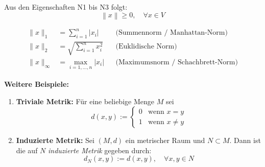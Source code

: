 \begin{bemerkungbox}
    Aus den Eigenschaften N1 bis N3 folgt:
    $$
        \left\|x\right\| \geq 0, \quad \forall x \in V
    $$
\end{bemerkungbox}

\begin{beispielbox}
    \begin{align*}
        \|x\|_1 &= \sum_{i=1}^n |x_i| && \text{(Summennorm / Manhattan-Norm)} \\
        \|x\|_2 &= \sqrt{\sum_{i=1}^n x_i^2} && \text{(Euklidische Norm)} \\
        \|x\|_\infty &= \max_{i=1,\dots,n} |x_i| && \text{(Maximumsnorm / Schachbrett-Norm)}
    \end{align*}



    \textbf{Weitere Beispiele:}
    \begin{enumerate}
        \item \textbf{Triviale Metrik:} Für eine beliebige Menge $M$ sei
        $$
        d(x, y) := \begin{cases}
            0 & \text{wenn } x = y \\
            1 & \text{wenn } x \neq y
        \end{cases}
        $$

        \item \textbf{Induzierte Metrik:} Sei $(M,d)$ ein metrischer Raum und $N \subset M$. Dann ist die auf $N$ \emph{induzierte Metrik} gegeben durch:
        $$
            d_N(x, y) := d(x, y), \quad \forall x, y \in N
        $$


\end{enumerate}
\end{beispielbox}
